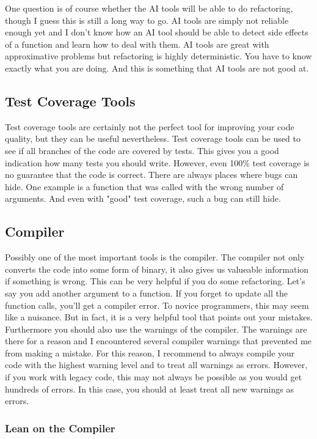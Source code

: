 One question is of course whether the AI tools will be able to do refactoring, though I guess this is still a long way to go. AI tools are simply not reliable enough yet and I don't know how an AI tool should be able to detect side effects of a function and learn how to deal with them. AI tools are great with approximative problems but refactoring is highly deterministic. You have to know exactly what you are doing. And this is something that AI tools are not good at.

\subsection{Test Coverage Tools}

Test coverage tools are certainly not the perfect tool for improving your code quality, but they can be useful nevertheless. Test coverage tools can be used to see if all branches of the code are covered by tests. This gives you a good indication how many tests you should write. However, even 100\% test coverage is no guarantee that the code is correct. There are always places where bugs can hide. One example is a function that was called with the wrong number of arguments. And even with "good" test coverage, such a bug can still hide.

\subsection{Compiler}

Possibly one of the most important tools is the compiler. The compiler not only converts the code into some form of binary, it also gives us valueable information if something is wrong. This can be very helpful if you do some refactoring. Let's say you add another argument to a function. If you forget to update all the function calls, you'll get a compiler error. To novice programmers, this may seem like a nuisance. But in fact, it is a very helpful tool that points out your mistakes. Furthermore you should also use the warnings of the compiler. The warnings are there for a reason and I encountered several compiler warnings that prevented me from making a mistake. For this reason, I recommend to always compile your code with the highest warning level and to treat all warnings as errors. However, if you work with legacy code, this may not always be possible as you would get hundreds of errors. In this case, you should at least treat all new warnings as errors.


\subsubsection*{Lean on the Compiler}

